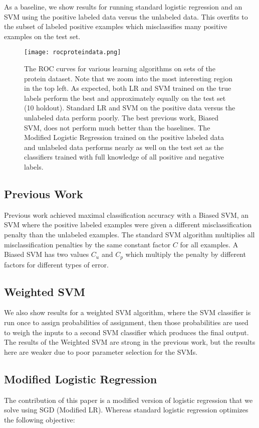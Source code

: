 \documentclass[]{article}
\begin{document}
As a baseline, we show results for running standard logistic regression and an SVM using the positive labeled data versus the unlabeled data.  This overfits to the subset of labeled positive examples which misclassifies many positive examples on the test set.


\label{ROC for Protein Dataset}
\begin{figure}[ht!]
\centering
\texttt{[image: rocproteindata.png]}
\caption{The ROC curves for various learning algorithms on sets of the protein dataset.  Note that we zoom into the most interesting region in the top left.  As expected, both LR and SVM trained on the true labels perform the best and approximately equally on the test set (10 holdout). Standard LR and SVM on the positive data versus the unlabeled data perform poorly.  The best previous work, Biased SVM, does not perform much better than the baselines.  The Modified Logistic Regression trained on the positive labeled data and unlabeled data performs nearly as well on the test set as the classifiers trained with full knowledge of all positive and negative labels.}
\end{figure}

\subsection{Previous Work}
Previous work\cite{elkan08} achieved maximal classification accuracy with a Biased SVM, an SVM where the positive labeled examples were given a different misclassification penalty than the unlabeled examples.  The standard SVM algorithm multiplies all misclassification penalties by the same constant factor $C$ for all examples. A Biased SVM has two values $C_u$ and $C_p$ which multiply the penalty by different factors for different types of error.

\subsection{Weighted SVM}
We also show results for a weighted SVM algorithm, where the SVM classifier is run once to assign probabilities of assignment, then those probabilities are used to weigh the inputs to a second SVM classifier which produces the final output.  The results of the Weighted SVM are strong in the previous work, but the results here are weaker  due to poor parameter selection for the SVMs.

\subsection{Modified Logistic Regression}
The contribution of this paper is a modified version of logistic regression that we solve using SGD (Modified LR).  Whereas standard logistic regression optimizes the following objective:
\end{document}
